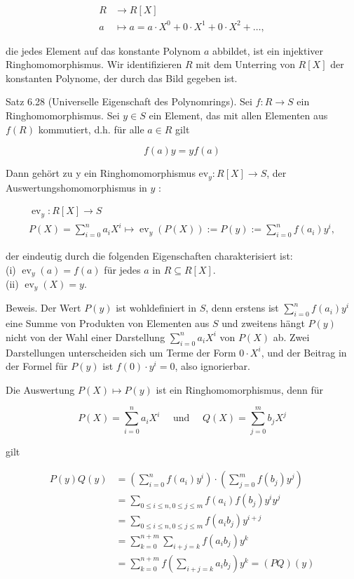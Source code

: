 \documentclass[10pt, letterpaper]{article}
\begin{document}
$$
\begin{aligned}
R & \rightarrow R[X] \\
a & \mapsto a=a \cdot X^{0}+0 \cdot X^{1}+0 \cdot X^{2}+\ldots,
\end{aligned}
$$

die jedes Element auf das konstante Polynom $a$ abbildet, ist ein injektiver Ringhomomorphismus. Wir identifizieren $R$ mit dem Unterring von $R[X]$ der konstanten Polynome, der durch das Bild gegeben ist.

Satz 6.28 (Universelle Eigenschaft des Polynomrings). Sei $f: R \rightarrow S$ ein Ringhomomorphismus. Sei $y \in S$ ein Element, das mit allen Elementen aus $f(R)$ kommutiert, d.h. für alle $a \in R$ gilt

$$
f(a) y=y f(a)
$$

Dann gehört zu y ein Ringhomomorphismus $\mathrm{ev}_{y}: R[X] \rightarrow S$, der Auswertungshomomorphismus in $y$ :

$$
\begin{gathered}
\operatorname{ev}_{y}: R[X] \rightarrow S \\
P(X)=\sum_{i=0}^{n} a_{i} X^{i} \mapsto \operatorname{ev}_{y}(P(X)):=P(y):=\sum_{i=0}^{n} f\left(a_{i}\right) y^{i},
\end{gathered}
$$

der eindeutig durch die folgenden Eigenschaften charakterisiert ist:\\
(i) $\operatorname{ev}_{y}(a)=f(a)$ für jedes $a$ in $R \subseteq R[X]$.\\
(ii) $\operatorname{ev}_{y}(X)=y$.

Beweis. Der Wert $P(y)$ ist wohldefiniert in $S$, denn erstens ist $\sum_{i=0}^{n} f\left(a_{i}\right) y^{i}$ eine Summe von Produkten von Elementen aus $S$ und zweitens hängt $P(y)$ nicht von der Wahl einer Darstellung $\sum_{i=0}^{n} a_{i} X^{i}$ von $P(X)$ ab. Zwei Darstellungen unterscheiden sich um Terme der Form $0 \cdot X^{i}$, und der Beitrag in der Formel für $P(y)$ ist $f(0) \cdot y^{i}=0$, also ignorierbar.

Die Auswertung $P(X) \mapsto P(y)$ ist ein Ringhomomorphismus, denn für

$$
P(X)=\sum_{i=0}^{n} a_{i} X^{i} \quad \text { und } \quad Q(X)=\sum_{j=0}^{m} b_{j} X^{j}
$$

gilt

$$
\begin{aligned}
P(y) Q(y) & =\left(\sum_{i=0}^{n} f\left(a_{i}\right) y^{i}\right) \cdot\left(\sum_{j=0}^{m} f\left(b_{j}\right) y^{j}\right) \\
& =\sum_{0 \leq i \leq n, 0 \leq j \leq m} f\left(a_{i}\right) f\left(b_{j}\right) y^{i} y^{j} \\
& =\sum_{0 \leq i \leq n, 0 \leq j \leq m} f\left(a_{i} b_{j}\right) y^{i+j} \\
& =\sum_{k=0}^{n+m} \sum_{i+j=k} f\left(a_{i} b_{j}\right) y^{k} \\
& =\sum_{k=0}^{n+m} f\left(\sum_{i+j=k} a_{i} b_{j}\right) y^{k}=(P Q)(y)
\end{aligned}
$$
\end{document}
